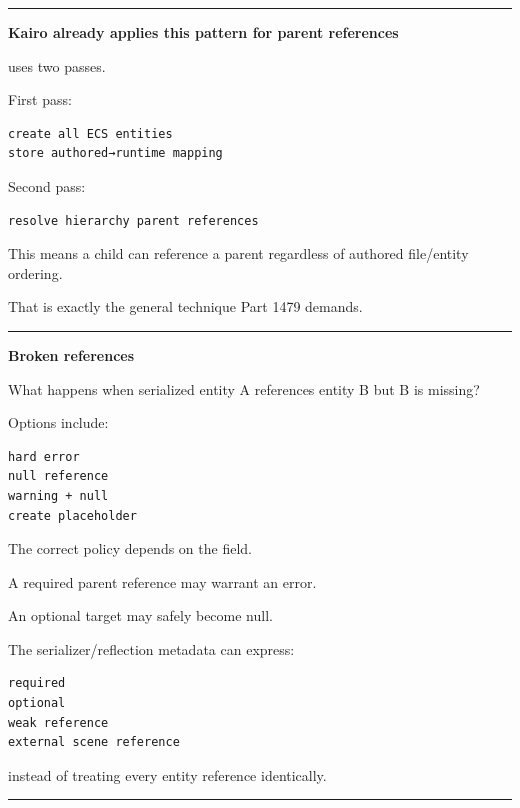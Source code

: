 \begin{center}\rule{0.5\linewidth}{0.5pt}\end{center}

\textbf{Kairo already applies this pattern for parent references}

 uses two passes.

First pass:

\begin{verbatim}
create all ECS entities
store authored→runtime mapping
\end{verbatim}

Second pass:

\begin{verbatim}
resolve hierarchy parent references
\end{verbatim}

This means a child can reference a parent regardless of authored file/entity ordering.

That is exactly the general technique Part 1479 demands.

\begin{center}\rule{0.5\linewidth}{0.5pt}\end{center}

\textbf{Broken references}

What happens when serialized entity A references entity B but B is missing?

Options include:

\begin{verbatim}
hard error
null reference
warning + null
create placeholder
\end{verbatim}

The correct policy depends on the field.

A required parent reference may warrant an error.

An optional target may safely become null.

The serializer/reflection metadata can express:

\begin{verbatim}
required
optional
weak reference
external scene reference
\end{verbatim}

instead of treating every entity reference identically.

\begin{center}\rule{0.5\linewidth}{0.5pt}\end{center}

